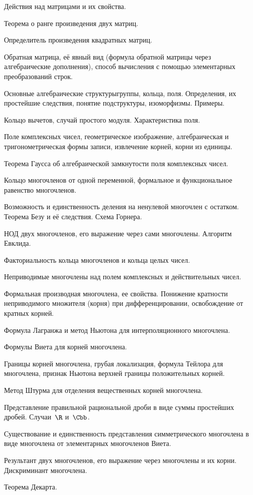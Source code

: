 \documentclass[a4paper]{article}
\begin{document}
\begin{nums}{-2}
\item Действия над матрицами и их свойства.
\item Теорема о ранге произведения двух матриц.
\item Определитель произведения квадратных матриц.
\item Обратная матрица, её явный вид (формула обратной матрицы через алгебраические дополнения),
способ вычисления с помощью элементарных преобразований строк.
\item Основные алгебраические структуры\т группы, кольца, поля. Определения, их простейшие
следствия, понятие подструктуры, изоморфизмы. Примеры.
\item Кольцо вычетов, случай простого модуля. Характеристика поля.
\item Поле комплексных чисел, геометрическое изображение, алгебраическая и тригонометрическая
формы записи, извлечение корней, корни из единицы.
\item Теорема Гаусса об алгебраической замкнутости поля комплексных чисел.
\item Кольцо многочленов от одной переменной, формальное и функциональное равенство
многочленов.
\item Возможность и единственность деления на ненулевой многочлен с остатком. Теорема Безу и её
следствия. Схема Горнера.
\item НОД двух многочленов, его выражение через сами многочлены. Алгоритм
Евклида.
\item Факториальность кольца многочленов и кольца целых чисел.
\item Неприводимые многочлены над полем комплексных и действительных чисел.
\item Формальная производная многочлена, ее свойства. Понижение кратности неприводимого
множителя (корня) при дифференцировании, освобождение от кратных корней.
\item Формула Лагранжа и метод Ньютона для интерполяционного многочлена.
\item Формулы Виета для корней многочлена.
\item Границы корней многочлена, грубая локализация, формула Тейлора для многочлена, признак
Ньютона верхней границы положительных корней.
\item Метод Штурма для отделения вещественных корней многочлена.
\item Представление правильной рациональной дроби в виде суммы простейших дробей. Случаи~$\R$
и~$\Cbb$.
\item Существование и единственность представления симметрического многочлена в виде многочлена
от элементарных многочленов Виета.
\item Результант двух многочленов, его выражение через многочлены и их корни. Дискриминант
многочлена.
\item Теорема Декарта.
\end{nums}
\pagebreak
\end{document}
